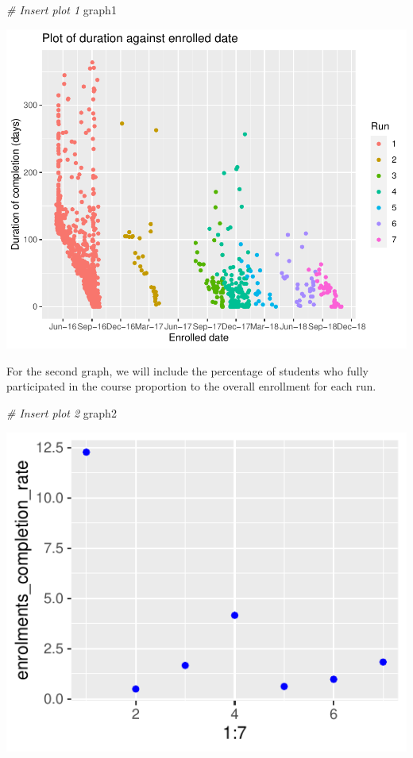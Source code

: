 \documentclass[12pt,]{article}
\newenvironment{Shaded}{\begin{snugshade}}{\end{snugshade}}
\newcommand{\CommentTok}[1]{\textcolor[rgb]{0.56,0.35,0.01}{\textit{#1}}}
\newcommand{\NormalTok}[1]{#1}
\begin{document}
\begin{Shaded}
\begin{Highlighting}[]
\CommentTok{\# Insert plot 1}
\NormalTok{graph1}
\end{Highlighting}
\end{Shaded}

\begin{center}\includegraphics{report_files/figure-latex/unnamed-chunk-3-1} \end{center}

For the second graph, we will include the percentage of students who
fully participated in the course proportion to the overall enrollment
for each run.

\begin{Shaded}
\begin{Highlighting}[]
\CommentTok{\# Insert plot 2}
\NormalTok{graph2}
\end{Highlighting}
\end{Shaded}

\begin{center}\includegraphics{report_files/figure-latex/unnamed-chunk-4-1} \end{center}
\end{document}
